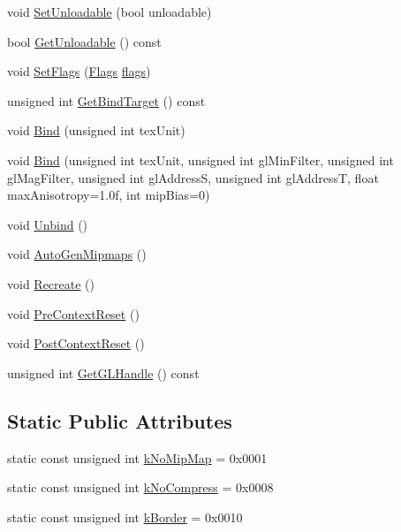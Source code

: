 \begin{CompactItemize}
\begin{CompactItemize}
\item 
void \hyperlink{class_gr_texture_base_db1eeb663d3d3301f675832b646be22e}{SetUnloadable} (bool unloadable)
\item 
bool \hyperlink{class_gr_texture_base_23cf8ef52445d659a710959b6a387eee}{GetUnloadable} () const 
\item 
void \hyperlink{class_gr_texture_base_09675e3d061d4389c54ad7e0df5cb674}{SetFlags} (\hyperlink{class_gr_texture_base_bee6ecbc7a70ea5f2acab8341a9696b5}{Flags} \hyperlink{_u_t_message_8h_0a3c0b351ab09281b662a9ff4f900a53}{flags})
\item 
unsigned int \hyperlink{class_gr_texture_base_a165e1c3061d2b3e2446a6d6566487ed}{GetBindTarget} () const 
\item 
void \hyperlink{class_gr_texture_base_4458c1c8d784beb36b228813f3edc6f0}{Bind} (unsigned int texUnit)
\item 
void \hyperlink{class_gr_texture_base_2e8a9316666ee28a1fc47e90d7929f6a}{Bind} (unsigned int texUnit, unsigned int glMinFilter, unsigned int glMagFilter, unsigned int glAddressS, unsigned int glAddressT, float maxAnisotropy=1.0f, int mipBias=0)
\item 
void \hyperlink{class_gr_texture_base_936b0525e5e40c7a4a591c5c345ee0ca}{Unbind} ()
\item 
void \hyperlink{class_gr_texture_base_54326c425dda6eea167e84f45ca46ff3}{AutoGenMipmaps} ()
\item 
void \hyperlink{class_gr_texture_base_b2752d6e88cda86e8c45b601941aa9b5}{Recreate} ()
\item 
void \hyperlink{class_gr_texture_base_e926c5f732cafa47d1336cc9b7637a44}{PreContextReset} ()
\item 
void \hyperlink{class_gr_texture_base_80d48b8534d812f3b452a32087e3ac74}{PostContextReset} ()
\item 
unsigned int \hyperlink{class_gr_texture_base_eeb990c8830fe5d9f49224ab211df183}{GetGLHandle} () const 
\end{CompactItemize}
\subsection*{Static Public Attributes}
\begin{CompactItemize}
\item 
static const unsigned int \hyperlink{class_gr_texture_base_47f4a8d764ba3c8e9e353a394edfcd2c}{kNoMipMap} = 0x0001
\item 
static const unsigned int \hyperlink{class_gr_texture_base_184780018f2b67996c9274798e52607e}{kNoCompress} = 0x0008
\item 
static const unsigned int \hyperlink{class_gr_texture_base_eadfc66a46b95c9a456782906da84890}{kBorder} = 0x0010
\end{CompactItemize}

\end{CompactItemize}
